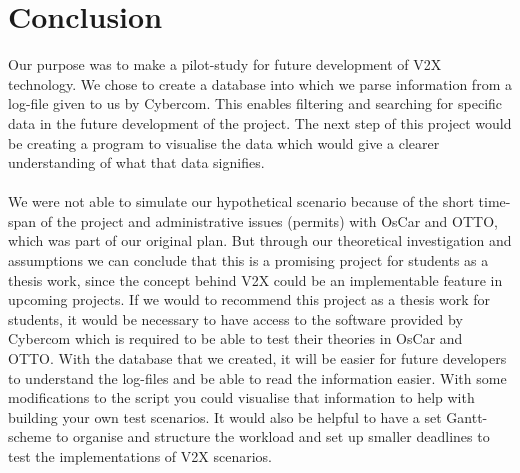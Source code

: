 \section{Conclusion}

Our purpose was to make a pilot-study for future development of V2X technology. We chose to create a database into which we parse information from a log-file given to us by Cybercom. This enables filtering and searching for specific data in the future development of the project. The next step of this project would be creating a program to visualise the data which would give a clearer understanding of what that data signifies. 
\paragraph{}
We were not able to simulate our hypothetical scenario because of the short time-span of the project and administrative issues (permits) with OsCar and OTTO, which was part of our original plan. But through our theoretical investigation and assumptions we can conclude that this is a promising project for students as a thesis work, since the concept behind V2X could be an implementable feature in upcoming projects. If we would to recommend this project as a thesis work for students, it would be necessary to have access to the software provided by Cybercom which is required to be able to test their theories in OsCar and OTTO. With the database that we created, it will be easier for future developers to understand the log-files and be able to read the information easier. With some modifications to the script you could visualise that information to help with building your own test scenarios. It would also be helpful to have a set Gantt-scheme to organise and structure the workload and set up smaller deadlines to test the implementations of V2X scenarios. 
 

